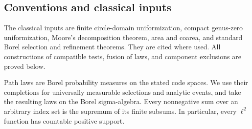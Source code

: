 \subsection{Conventions and classical inputs}

The classical inputs are finite circle-domain uniformization, compact
genus-zero uniformization, Moore's decomposition theorem, area and
coarea, and standard Borel selection and refinement theorems. They are
cited where used. All constructions of compatible tests, fusion of
laws, and component exclusions are proved below.

Path laws are Borel probability measures on the stated code spaces.
We use their completions for universally measurable selections and
analytic events, and take the resulting laws on the Borel
sigma-algebra. Every nonnegative sum over an arbitrary index set is the
supremum of its finite subsums. In particular, every $\ell^2$ function
has countable positive support.
